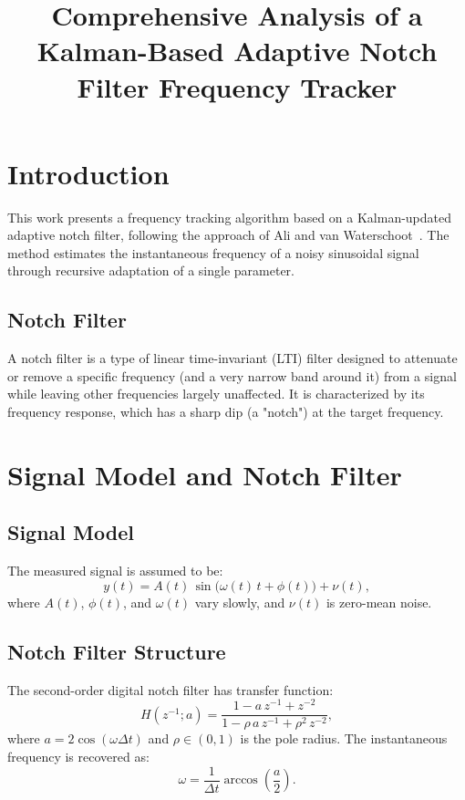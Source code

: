 \documentclass{article}
\title{Comprehensive Analysis of a Kalman-Based Adaptive Notch Filter Frequency Tracker}
\author{}
\date{}
\begin{document}
\maketitle

\section{Introduction}
This work presents a frequency tracking algorithm based on a Kalman-updated adaptive notch filter, following the approach of Ali and van Waterschoot~\cite{AliWaterschoot2023}. The method estimates the instantaneous frequency of a noisy sinusoidal signal through recursive adaptation of a single parameter.

\subsection{Notch Filter}
A notch filter is a type of linear time-invariant (LTI) filter designed to attenuate or remove a specific frequency (and a very narrow band around it) from a signal while leaving other frequencies largely unaffected. It is characterized by its frequency response, which has a sharp dip (a "notch") at the target frequency.

\section{Signal Model and Notch Filter}
\subsection{Signal Model}
The measured signal is assumed to be:
\begin{equation}
y(t) = A(t)\,\sin\bigl(\omega(t)\,t + \phi(t)\bigr) + \nu(t),
\label{eq:signal_model}
\end{equation}
where $A(t)$, $\phi(t)$, and $\omega(t)$ vary slowly, and $\nu(t)$ is zero-mean noise.

\subsection{Notch Filter Structure}
The second-order digital notch filter has transfer function:
\begin{equation}
H(z^{-1};a) = \frac{1 - a\,z^{-1} + z^{-2}}{1 - \rho\,a\,z^{-1} + \rho^2\,z^{-2}},
\label{eq:notch_tf}
\end{equation}
where $a = 2\cos(\omega \Delta t)$ and $\rho \in (0,1)$ is the pole radius. The instantaneous frequency is recovered as:
\begin{equation}
\omega = \frac{1}{\Delta t}\arccos\!\left(\frac{a}{2}\right).
\label{eq:freq_estimate}
\end{equation}
\end{document}
